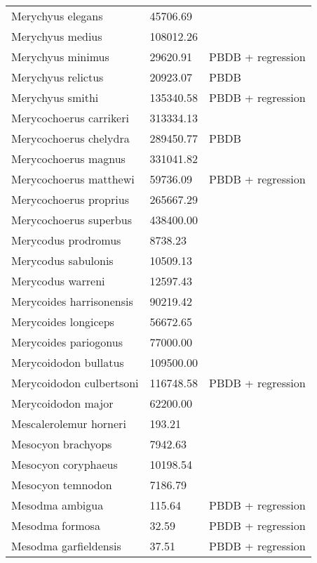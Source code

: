 \documentclass{article}
\begin{document}
\begin{center}
\begin{longtable}{p{} p{} p{}}
    Merychyus elegans & 45706.69 & \cite{Tomiya2013} \\ 
    Merychyus medius & 108012.26 & \cite{Tomiya2013} \\ 
    Merychyus minimus & 29620.91 & PBDB + regression \\ 
    Merychyus relictus & 20923.07 & PBDB \\ 
    Merychyus smithi & 135340.58 & PBDB + regression \\ 
    Merycochoerus carrikeri & 313334.13 & \cite{Rose2011a} \\ 
    Merycochoerus chelydra & 289450.77 & PBDB \\ 
    Merycochoerus magnus & 331041.82 & \cite{Tomiya2013} \\ 
    Merycochoerus matthewi & 59736.09 & PBDB + regression \\ 
    Merycochoerus proprius & 265667.29 & \cite{Tomiya2013} \\ 
    Merycochoerus superbus & 438400.00 & \cite{McKenna2011} \\ 
    Merycodus prodromus & 8738.23 & \cite{Kelley1954} \\ 
    Merycodus sabulonis & 10509.13 & \cite{Tomiya2013} \\ 
    Merycodus warreni & 12597.43 & \cite{Baskin2004} \\ 
    Merycoides harrisonensis & 90219.42 & \cite{Tomiya2013} \\ 
    Merycoides longiceps & 56672.65 & \cite{Stock1948} \\ 
    Merycoides pariogonus & 77000.00 & \cite{McKenna2011} \\ 
    Merycoidodon bullatus & 109500.00 & \cite{McKenna2011} \\ 
    Merycoidodon culbertsoni & 116748.58 & PBDB + regression \\ 
    Merycoidodon major & 62200.00 & \cite{McKenna2011} \\ 
    Mescalerolemur horneri & 193.21 & \cite{MacIntyre1966} \\ 
    Mesocyon brachyops & 7942.63 & \cite{Tomiya2013} \\ 
    Mesocyon coryphaeus & 10198.54 & \cite{Tomiya2013} \\ 
    Mesocyon temnodon & 7186.79 & \cite{Tomiya2013} \\ 
    Mesodma ambigua & 115.64 & PBDB + regression \\ 
    Mesodma formosa & 32.59 & PBDB + regression \\ 
    Mesodma garfieldensis & 37.51 & PBDB + regression \\ 

\end{longtable}
\end{center}
\end{document}

